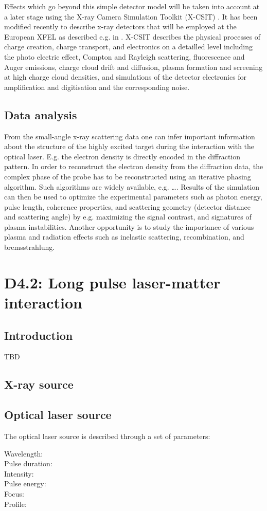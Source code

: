 \documentclass[a4paper]{article}
\begin{document}
Effects which go beyond this simple detector model will be taken into account at a later stage using the
X-ray Camera Simulation Toolkit (X-CSIT) \cite{Joy2015}. It has been modified recently to describe x-ray
detectors that will be employed at the European XFEL as described e.g. in \cite{Rueter2016}. X-CSIT describes the physical processes
of charge creation, charge transport, and electronics on a detailled level including the photo electric effect, Compton
and Rayleigh scattering, fluorescence and Auger emissions, charge cloud drift and diffusion, plasma formation and screening at
high charge cloud densities, and simulations of the detector electronics for amplification and digitisation and the corresponding
noise.
%
\subsection{Data analysis}
From the small-angle x-ray scattering data one can infer important information about the structure of the highly excited target during
the interaction with the optical laser. E.g. the electron density is directly encoded in the diffraction pattern. In order to
reconstruct the electron density from the diffraction data, the complex phase of the probe has to be reconstructed using an iterative phasing
algorithm. Such algorithms are widely available, e.g. \ldots {}.
Results of the simulation can then be used to optimize the experimental parameters such as photon energy, pulse length,
coherence properties, and scattering geometry (detector distance and scattering angle) by e.g. maximizing the signal contrast,
and signatures of plasma instabilities. Another opportunity is to study the importance of various plasma and radiation effects
such as inelastic scattering, recombination, and bremsstrahlung.

\section{D4.2: Long pulse laser-matter interaction\label{sec:long_pulse}}
\subsection{Introduction}
TBD
\subsection{X-ray source}
\subsection{Optical laser source}
The optical laser source is described through a set of parameters:
\begin{description}
  \item[Wavelength:]
  \item[Pulse duration:]
  \item[Intensity:]
  \item[Pulse energy:]
  \item[Focus:]
  \item[Profile:]
\end{description}
\end{document}
